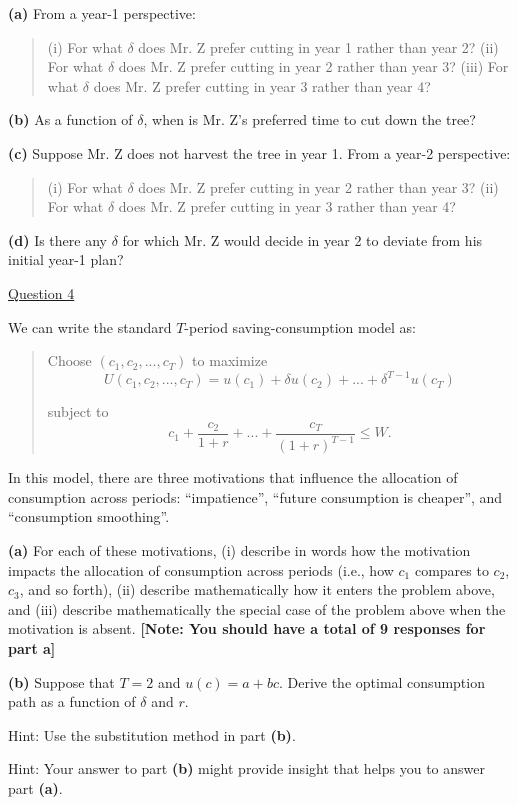 \documentclass[12pt]{article}
\theoremstyle{definition}
\begin{document}
\textbf{(a)} From a year-1 perspective:

\begin{quotation}
	(i) For what $\delta $ does Mr. Z prefer cutting in year 1 rather than year
	2?\newline
	(ii) For what $\delta $ does Mr. Z prefer cutting in year 2 rather than year
	3?\newline
	(iii) For what $\delta $ does Mr. Z prefer cutting in year 3 rather than
	year 4?
\end{quotation}

\textbf{(b)} As a function of $\delta $, when is Mr. Z's preferred time to
cut down the tree?

\textbf{(c)} Suppose Mr. Z does not harvest the tree in year 1. From a
year-2 perspective:

\begin{quotation}
	(i) For what $\delta $ does Mr. Z prefer cutting in year 2 rather than year
	3?\newline
	(ii) For what $\delta $ does Mr. Z prefer cutting in year 3 rather than year
	4?
\end{quotation}

\textbf{(d)} Is there any $\delta $ for which Mr. Z would decide in year 2
to deviate from his initial year-1 plan?

\bigskip

\underline{Question 4}

We can write the standard $T$-period saving-consumption model as:

\begin{quotation}
	Choose $(c_{1},c_{2},...,c_{T})$ to maximize%
	\[
	U(c_{1},c_{2},...,c_{T})=u(c_{1})+\delta u(c_{2})+...+\delta ^{T-1}u(c_{T}) 
	\]
	
	subject to%
	\[
	c_{1}+\frac{c_{2}}{1+r}+...+\frac{c_{T}}{(1+r)^{T-1}}\leq W. 
	\]
\end{quotation}

In this model, there are three motivations that influence the allocation of
consumption across periods: \textquotedblleft impatience\textquotedblright ,
\textquotedblleft future consumption is cheaper\textquotedblright , and
\textquotedblleft consumption smoothing\textquotedblright .

\textbf{(a)} For each of these motivations, (i) describe in words how the
motivation impacts the allocation of consumption across periods (i.e., how $%
c_{1}$ compares to $c_{2}$, $c_{3}$, and so forth), (ii) describe
mathematically how it enters the problem above, and (iii) describe
mathematically the special case of the problem above when the motivation is
absent.
\textbf{[Note: You should have a total of 9 responses for part a]}

\textbf{(b)} Suppose that $T=2$ and $u(c)=a+bc$. Derive the optimal
consumption path as a function of $\delta $ and $r$.

Hint: Use the substitution method in part \textbf{(b)}.

Hint: Your answer to part \textbf{(b)} might provide insight that helps you
to answer part \textbf{(a)}.
\end{document}
